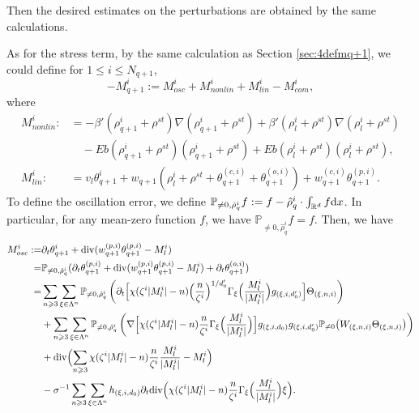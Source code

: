 \documentclass[UTF-8,reqno]{amsart}
\numberwithin{equation}{section}
\theoremstyle{definition}
\def\dif{{\mathord{{\rm d}}}}
\def\geq{\geqslant}
\def\leq{\leqslant}
\def\div{\mathord{{\rm div}}}
\def\dif{{\mathord{{\rm d}}}}
\def\geq{\geqslant}
\def\leq{\leqslant}
\def\div{\mathord{{\rm div}}}
\begin{document}
 Then the desired estimates on the perturbations are obtained by the same calculations.
  
 
 As for the stress term, by the same calculation as Section \ref{sec:4defmq+1}, we could  define  for $1\leq i\leq N_{q+1}$,
$$-{M}^i _{q+1}:=M^i_{osc}+M^i_{nonlin}+M^i_{lin}-M^i_{com},$$
where \begin{align*} 
M^{i}_{nonlin}:&= -  \beta'(\rho^{i}_{q+1}+\rho^{st}) \nabla(\rho^{i}_{q+1}+\rho^{st})+\beta'(\rho^{i}_{l}+\rho^{st})\nabla (\rho^{i}_{l}+\rho^{st} )\\
&\quad-Eb( \rho_{q+1}^i+\rho^{st})(\rho_{q+1}^i+\rho^{st})+Eb(\rho_{l}^i+\rho^{st})(\rho_{l}^i+\rho^{st}),\\
M^{i}_{lin}:&=v_l\theta^{i}_{q+1}+w_{q+1}(\rho^{i}_l+\rho^{st}+\theta_{q+1}^{(c,i)}+\theta_{q+1}^{(o,i)}) +w_{q+1}^{(c,i)}\theta_{q+1}^{(p,i)}.
\end{align*}
 To define the oscillation error,  we define
$\mathbb{P}_{\neq 0,\hat{\rho}^i_q}f:=f- \hat{\rho}^i_q\cdot\int_{\mathbb{R}^d}f\dif x$.  
In particular, for any mean-zero function $f$, we have 
 $\mathbb{P}_{\neq 0,\hat{\rho}^i_q}f=f$. Then, we have 
\begin{align}
M^{i}_{osc}:= &\partial_t\theta^{i}_{q+1}+\div (w_{q+1}^{(p,i)}\theta_{q+1}^{(p,i)}-M^{i}_l)\notag\\
 =&\mathbb{P}_{\neq 0,\hat{\rho}^i_q} (\partial_t\theta^{(p,i)}_{q+1}+\div (w_{q+1}^{(p,i)}\theta_{q+1}^{(p,i)}-M^{i}_l)+\partial_t\theta^{(o,i)}_{q+1}
 )\notag\\ 
=
&
\sum_{n\geq3}
\sum_{\xi\in\Lambda^n}
\mathbb{P}_{\neq 0,\hat{\rho}^i_q}\left(\partial_t
\Bigl[
\chi(\zeta^i|M_l^i|-n)
\Bigl(\frac{n}{\zeta^i}\Bigr)^{1/d_0'}
\Gamma_\xi\Bigl(\frac{M_l^i}{|M_l^i|}\Bigr)
g_{(\xi,i,d_0')}
\Bigr]
\Theta_{(\xi,n,i)}\right)
\notag\\
&+
\sum_{n\geq3}
\sum_{\xi\in\Lambda^n}
\mathbb{P}_{\neq 0,\hat{\rho}^i_q}\left(\nabla
\Bigl[
\chi(\zeta^i|M_l^i|-n)
\frac{n}{\zeta^i}
\Gamma_\xi\Bigl(\frac{M_l^i}{|M_l^i|}\Bigr)
\Bigr]
g_{(\xi,i,d_0)}
g_{(\xi,i,d_0')}
\mathbb{P}_{\neq0}
\bigl(
W_{(\xi,n,i)}
\Theta_{(\xi,n,i)}
\bigr)
\right)\notag\\
&+
\div
\Bigl(
\sum_{n\geq3}
\chi(\zeta^i|M_l^i|-n)
\frac{n}{\zeta^i}
\frac{M_l^i}{|M_l^i|}
-
M_l^i
\Bigr)
\notag\\
&-
\sigma^{-1}
\sum_{n\geq3}
\sum_{\xi\in\Lambda^n}
h_{(\xi,i,d_0)}
\partial_t
\div
\Bigl(
\chi(\zeta^i|M_l^i|-n)
\frac{n}{\zeta^i}
\Gamma_\xi\Bigl(\frac{M_l^i}{|M_l^i|}\Bigr)
\xi
\Bigr).\notag
\end{align}
\end{document}
